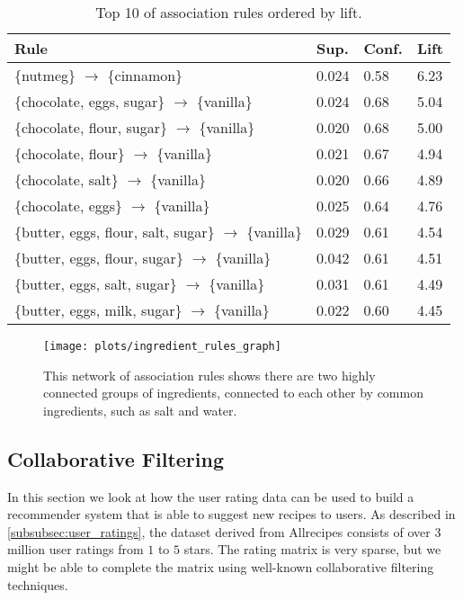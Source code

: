 \begin{table}[htbp]
	\caption{Top 10 of association rules ordered by lift.}
	\label{tab:rules_top10}
	
	\centering
	\begin{tabular}{l l l l}
		\toprule
		\textbf{Rule} & \textbf{Sup.} & \textbf{Conf.} & \textbf{Lift} \\
		\midrule
		\{nutmeg\} $\rightarrow$ \{cinnamon\} & 0.024 & 0.58 & 6.23 \\
		\{chocolate, eggs, sugar\} $\rightarrow$ \{vanilla\} & 0.024 & 0.68 & 5.04 \\
		\{chocolate, flour, sugar\} $\rightarrow$ \{vanilla\} & 0.020 & 0.68 & 5.00 \\
		\{chocolate, flour\} $\rightarrow$ \{vanilla\} & 0.021 & 0.67 & 4.94 \\
		\{chocolate, salt\} $\rightarrow$ \{vanilla\} & 0.020 & 0.66 & 4.89 \\
		\{chocolate, eggs\} $\rightarrow$ \{vanilla\} & 0.025 & 0.64 & 4.76 \\
		\{butter, eggs, flour, salt, sugar\} $\rightarrow$ \{vanilla\} & 0.029 & 0.61 & 4.54 \\
		\{butter, eggs, flour, sugar\} $\rightarrow$ \{vanilla\} & 0.042 & 0.61 & 4.51 \\
		\{butter, eggs, salt, sugar\} $\rightarrow$ \{vanilla\} & 0.031 & 0.61 & 4.49 \\
		\{butter, eggs, milk, sugar\} $\rightarrow$ \{vanilla\} & 0.022 & 0.60 & 4.45 \\
		\bottomrule
	\end{tabular}
	
\end{table}

\begin{figure}[htbp]
		
\end{figure}


\begin{figure}[htbp]
	\centering

	\texttt{[image: plots/ingredient\_rules\_graph]}
	
	\caption{This network of association rules shows there are two highly connected groups of ingredients, connected to each other by common ingredients, such as salt and water.}
	\label{fig:ingredient_rules_graph}
\end{figure}




\subsection{Collaborative Filtering}
\label{subsec:collaborative_filtering}

In this section we look at how the user rating data can be used to build a recommender system that is able to suggest new recipes to users.
As described in \cref{subsubsec:user_ratings}, the dataset derived from Allrecipes consists of over $3$ million user ratings from $1$ to $5$ stars.
The rating matrix is very sparse, but we might be able to complete the matrix using well-known collaborative filtering techniques.